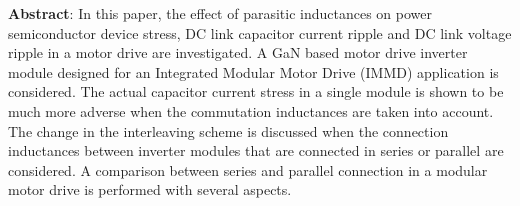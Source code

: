 \vspace{-1em}
\textbf{Abstract}: 
In this paper, the effect of parasitic inductances on power semiconductor device stress, DC link capacitor current ripple and DC link voltage ripple in a motor drive are investigated. A GaN based motor drive inverter module designed for an Integrated Modular Motor Drive (IMMD) application is considered. The actual capacitor current stress in a single module is shown to be much more adverse when the commutation inductances are taken into account. The change in the interleaving scheme is discussed when the connection inductances between inverter modules that are connected in series or parallel are considered. A comparison between series and parallel connection in a modular motor drive is performed with several aspects.

